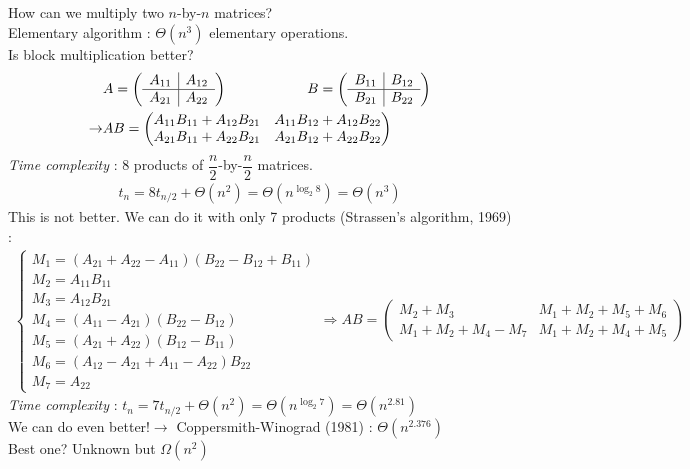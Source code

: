 \documentclass[12pt,a4paper]{report}
\theoremstyle{break}
\begin{document}
How can we multiply two $n$-by-$n$ matrices?\\
Elementary algorithm : $\Theta(n^3)$ elementary operations.\\
Is block multiplication better?
\begin{align*}
&A=\left(\begin{array}{c|c}
A_{11} & A_{12}\\
\hline
A_{21} & A_{22}
\end{array}\right) \hspace*{2cm} B=\left(\begin{array}{c|c}
B_{11} & B_{12}\\
\hline
B_{21} & B_{22}
\end{array}\right)\\
\rightarrow &AB=\begin{pmatrix}
A_{11}B_{11}+A_{12}B_{21} & A_{11}B_{12}+A_{12}B_{22}\\
A_{21}B_{11}+A_{22}B_{21} & A_{21}B_{12}+A_{22}B_{22}
\end{pmatrix}
\end{align*}
\emph{Time complexity} : 8 products of $\dfrac{n}{2}$-by-$\dfrac{n}{2}$ matrices.
\begin{align*}
t_n=8t_{n/2}+\Theta(n^2)=\Theta\left(n^{\log_2 8}\right)=\Theta\left(n^3\right)
\end{align*}
This is not better. We can do it with only 7 products (Strassen's algorithm, 1969) : 
\begin{align*}
\left\{\begin{array}{l}
M_1=(A_{21}+A_{22}-A_{11})(B_{22}-B_{12}+B_{11})\\
M_2=A_{11}B_{11}\\
M_3=A_{12}B_{21}\\
M_4=(A_{11}-A_{21})(B_{22}-B_{12})\\
M_5=(A_{21}+A_{22})(B_{12}-B_{11})\\
M_6=(A_{12}-A_{21}+A_{11}-A_{22})B_{22}\\
M_7=A_{22}
\end{array}\right. \Rightarrow AB=\begin{pmatrix}
M_2+M_3 & M_1+M_2+M_5+M_6\\
M_1+M_2+M_4-M_7 & M_1+M_2+M_4+M_5
\end{pmatrix}
\end{align*}
\emph{Time complexity} : $t_n=7t_{n/2}+\Theta(n^2)=\Theta\left(n^{\log_2 7}\right)=\Theta\left(n^{2.81}\right)$\\
We can do even better!$\rightarrow$ Coppersmith-Winograd (1981) : $\Theta(n^{2.376})$\\
Best one? Unknown but $\Omega(n^2)$\\
\end{document}

